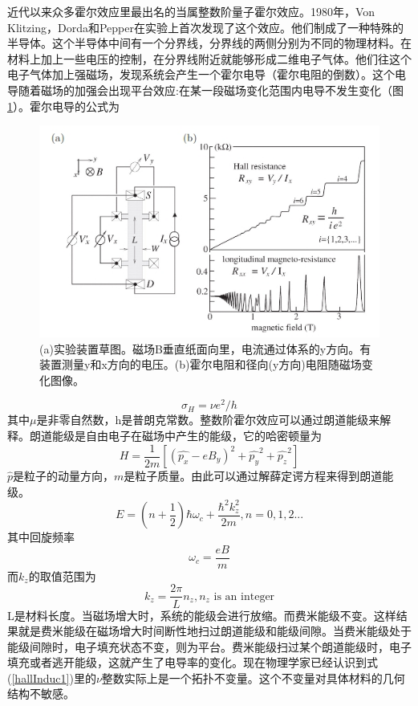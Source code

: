 近代以来众多霍尔效应里最出名的当属整数阶量子霍尔效应。1980年，Von Klitzing，Dorda和Pepper在实验上首次发现了这个效应\cite{intHall}。他们制成了一种特殊的半导体。这个半导体中间有一个分界线，分界线的两侧分别为不同的物理材料。在材料上加上一些电压的控制，在分界线附近就能够形成二维电子气体。他们往这个电子气体加上强磁场，发现系统会产生一个霍尔电导（霍尔电阻的倒数）。这个电导随着磁场的加强会出现平台效应:在某一段磁场变化范围内电导不发生变化（图\ref{integerHall}）。霍尔电导的公式为
\begin {figure}[tbp]
\centering 
\includegraphics[width=12cm]{./images/hallR.jpg} 
\caption{(a)实验装置草图。磁场B垂直纸面向里，电流通过体系的y方向。有装置测量y和x方向的电压。(b)霍尔电阻和径向(y方向)电阻随磁场变化图像。\cite{hallR}}
\label{integerHall}
\end {figure}
\begin{equation}
  \sigma_H = \nu e^2 / h
  \label{hallInduc1}
\end{equation}
其中$\mu$是非零自然数，h是普朗克常数。整数阶霍尔效应可以通过朗道能级来解释。朗道能级是自由电子在磁场中产生的能级，它的哈密顿量为
\begin{equation}
  H = \frac{1}{2m}[(\hat{p_x} - e B_y)^2 + \hat{p_y}^2 + \hat{p_z}^2]
\end{equation}
$\hat{p}$是粒子的动量方向，$m$是粒子质量。由此可以通过解薛定谔方程来得到朗道能级。
\begin{equation}
  E = (n + \frac{1}{2})\hbar \omega_c + \frac{\hbar^2 k_z^2}{2m}, n = 0, 1, 2...
\end{equation}
其中回旋频率
\begin{equation}
  \omega_c = \frac{eB}{m}
\end{equation}
而$k_z$的取值范围为
\begin{equation}
  k_z = \frac{2 \pi}{L} n_z, n_z \mbox{ is an integer}
\end{equation}
L是材料长度。当磁场增大时，系统的能级会进行放缩。而费米能级不变。这样结果就是费米能级在磁场增大时间断性地扫过朗道能级和能级间隙。当费米能级处于能级间隙时，电子填充状态不变，则为平台。费米能级扫过某个朗道能级时，电子填充或者逃开能级，这就产生了电导率的变化。现在物理学家已经认识到式(\ref{hallInduc1})里的$\nu$整数实际上是一个拓扑不变量\cite{nuIsTopo}。这个不变量对具体材料的几何结构不敏感。

